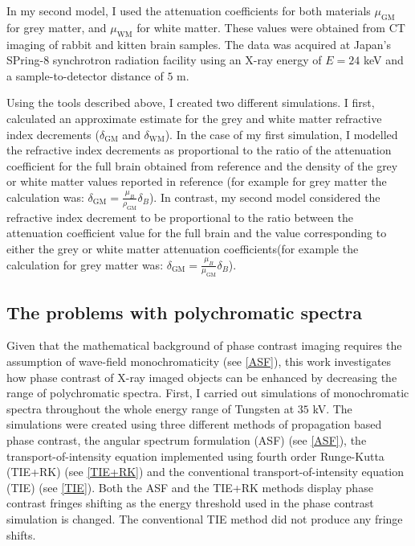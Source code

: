 \documentclass[10pt, a4paper, singlespacing]{report}
\begin{document}
In my second model, I used the attenuation coefficients for both materials $\mu_{\mathrm{GM}}$ for grey matter, and $\mu_{\mathrm{WM}}$ for white matter. These values were obtained from CT imaging of rabbit and kitten brain samples. The data was acquired at Japan's SPring-8 synchrotron radiation facility using an X-ray energy of $E = 24$ keV and a sample-to-detector distance of $5$ m\cite{Linda}.

Using the tools described above, I created two different simulations. I first, calculated an approximate estimate for the grey and white matter refractive index decrements ($\delta_{\mathrm{GM}}$ and $\delta_{\mathrm{WM}}$). In the case of my first simulation, I modelled the refractive index decrements as proportional to the ratio of the attenuation coefficient for the full brain obtained from reference \cite{NIST} and the density of the grey or white matter values reported in reference \cite{ITIS} (for example for grey matter the calculation was: $\delta_{\mathrm{GM}} = \frac{\mu_B}{\rho_{\mathrm{GM}}} \delta_B$). In contrast, my second model considered the refractive index decrement to be proportional to the ratio between the attenuation coefficient value for the full brain and the value corresponding to either the grey or white matter attenuation coefficients(for example the calculation for grey matter was: $\delta_{\mathrm{GM}} = \frac{\mu_B}{\mu_{\mathrm{GM}}} \delta_B$). 


\subsection{The problems with polychromatic spectra}\label{poly}
Given that the mathematical background of phase contrast imaging requires the assumption of wave-field monochromaticity (see \ref{ASF}), this work investigates how phase contrast of X-ray imaged objects can be enhanced by decreasing the range of polychromatic spectra. 
First, I carried out simulations of monochromatic spectra throughout the whole energy range of Tungsten at $35$ kV. The simulations were created using three different methods of propagation based phase contrast, the angular spectrum formulation (ASF) (see \ref{ASF}), the transport-of-intensity equation implemented using fourth order Runge-Kutta (TIE+RK) (see \ref{TIE+RK}) and the conventional transport-of-intensity equation (TIE) (see \ref{TIE}). Both the ASF and the TIE+RK methods display phase contrast fringes shifting as the energy threshold used in the phase contrast simulation is changed. The conventional TIE method did not produce any fringe shifts. 
\end{document}

